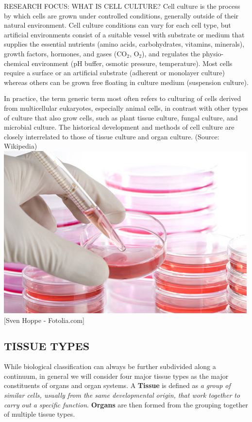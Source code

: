\documentclass[10pt,twoside,twocolumn]{article}
\begin{document}
\begin{paperbox}{RESEARCH FOCUS: WHAT IS CELL CULTURE?}
Cell culture is the process by which cells are grown under controlled conditions, generally outside of their natural environment. Cell culture conditions can vary for each cell type, but artificial environments consist of a suitable vessel with substrate or medium that supplies the essential nutrients (amino acids, carbohydrates, vitamins, minerals), growth factors, hormones, and gases (CO$_2$, O$_2$), and regulates the physio-chemical environment (pH buffer, osmotic pressure, temperature). Most cells require a surface or an artificial substrate (adherent or monolayer culture) whereas others can be grown free floating in culture medium (suspension culture).

In practice, the term generic term  most often refers to  culturing of cells derived from multicellular eukaryotes, especially animal cells, in contrast with other types of culture that also grow cells, such as plant tissue culture, fungal culture, and microbial culture. The historical development and methods of cell culture are closely interrelated to those of tissue culture and organ culture. (Source: Wikipedia)
\includegraphics[width=\textwidth]{CElCulture.jpg}
[Sven Hoppe - Fotolia.com]
\end{paperbox}

\subsection{TISSUE TYPES}
While biological classification can always be further subdivided along a continuum, in general we will consider four major tissue types as the major constituents of organs and organ systems.  A \textbf{Tissue} is defined as \textit{a group of similar cells, usually from the same developmental origin, that work together to carry out a specific function}. \textbf{Organs} are then formed from the grouping together of multiple tissue types.
\end{document}
